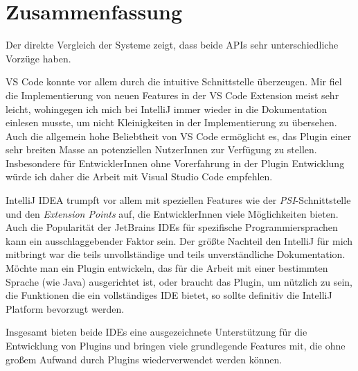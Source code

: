 \chapter{Zusammenfassung}
\label{cha:Conclusion}

Der direkte Vergleich der Systeme zeigt,
dass beide APIs sehr unterschiedliche Vorzüge haben.

VS Code konnte vor allem durch die intuitive
Schnittstelle überzeugen. Mir fiel die Implementierung
von neuen Features in der VS Code Extension meist sehr
leicht, wohingegen ich mich bei IntelliJ immer wieder
in die Dokumentation einlesen musste, um nicht
Kleinigkeiten in der Implementierung zu übersehen.
Auch die allgemein hohe Beliebtheit von VS Code
ermöglicht es, das Plugin einer sehr breiten Masse 
an potenziellen NutzerInnen zur Verfügung zu stellen.
Insbesondere für EntwicklerInnen ohne Vorerfahrung
in der Plugin Entwicklung würde ich daher die Arbeit mit
Visual Studio Code empfehlen.

IntelliJ IDEA trumpft vor allem mit speziellen Features
wie der \emph{PSI}-Schnittstelle und den \emph{Extension Points} auf,
die EntwicklerInnen viele Möglichkeiten bieten.
Auch die Popularität der JetBrains IDEs für spezifische 
Programmiersprachen kann ein ausschlaggebender Faktor
sein. Der größte Nachteil den IntelliJ für mich mitbringt
war die teils unvollständige und teils unverständliche
Dokumentation. Möchte man ein Plugin entwickeln, das 
für die Arbeit mit einer bestimmten Sprache (wie Java)
ausgerichtet ist, oder braucht das Plugin, um nützlich zu
sein, die Funktionen die ein vollständiges IDE bietet, so
sollte definitiv die IntelliJ Platform bevorzugt werden.

Insgesamt bieten beide IDEs eine ausgezeichnete 
Unterstützung für die Entwicklung von Plugins und
bringen viele grundlegende Features mit, die
ohne großem Aufwand durch Plugins wiederverwendet
werden können.